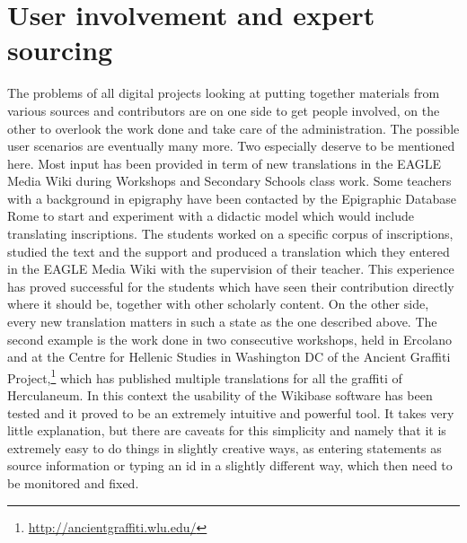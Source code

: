 \documentclass[amsthm,ebook]{saparticle}
\begin{document}
\section{User involvement and expert sourcing}
The problems of all digital projects looking at putting together materials from various sources and contributors are on one side to get people involved, on the other to overlook the work done and take care of the administration.  
The possible user scenarios are eventually many more. Two especially deserve to be mentioned here. Most input has been provided in term of new translations in the EAGLE Media Wiki during Workshops and Secondary Schools class work. Some teachers with a background in epigraphy have been contacted by the Epigraphic Database Rome to start and experiment with a didactic model which would include translating inscriptions. The students worked on a specific corpus of inscriptions, studied the text and the support and produced a translation which they entered in the EAGLE Media Wiki with the supervision of their teacher. This experience has proved successful for the students which have seen their contribution directly where it should be, together with other scholarly content. On the other side, every new translation matters in such a state as the one described above. 
The second example is the work done in two consecutive workshops, held in Ercolano and at the Centre for Hellenic Studies in Washington DC of the Ancient Graffiti Project,\footnote{\url{http://ancientgraffiti.wlu.edu/}} which has published multiple translations for all the graffiti of Herculaneum. In this context the usability of the Wikibase software has been tested and it proved to be an extremely intuitive and powerful tool. It takes very little explanation, but there are caveats for this simplicity and namely that it is extremely easy to do things in slightly creative ways, as entering statements as source information or typing an id in a slightly different way, which then need to be monitored and fixed.
\end{document}
